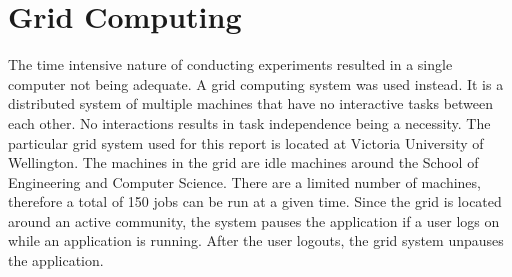 \section{Grid Computing}
The time intensive nature of conducting experiments resulted in a single computer not being adequate. A grid computing system was used instead. It is a distributed system of multiple machines that have no interactive tasks between each other. No interactions results in task independence being a necessity. The particular grid system used for this report is located at Victoria University of Wellington. The machines in the grid are idle machines around the School of Engineering and Computer Science. There are a limited number of machines, therefore a total of 150 jobs can be run at a given time. Since the grid is located around an active community, the system pauses the application if a user logs on while an application is running. After the user logouts, the grid system unpauses the application.